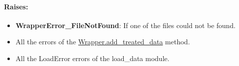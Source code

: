 \paragraph{Raises:}
\begin{itemize}
    \item \textbf{WrapperError\_FileNotFound}: If one of the files could not be found.
    \item All the errors of the \hyperref[subsec:wrapper.add_treated_data]{Wrapper.add\_treated\_data} method.
    \item All the LoadError errors of the load\_data module.
\end{itemize}




